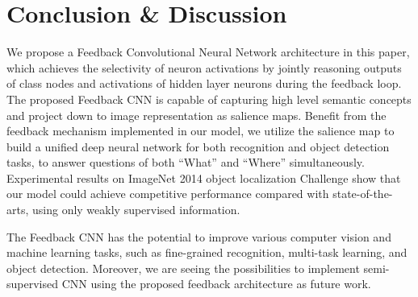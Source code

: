 \section{Conclusion \& Discussion}
\label{sec:conclusion}

We propose a Feedback Convolutional Neural Network architecture in this paper, which achieves the selectivity of neuron activations by jointly reasoning outputs of class nodes and activations of hidden layer neurons during the feedback loop. The proposed Feedback CNN is capable of capturing high level semantic concepts and project down to image representation as salience maps. Benefit from the feedback mechanism implemented in our model, we utilize the salience map to build a unified deep neural network for both recognition and object detection tasks, to answer questions of both ``What'' and ``Where'' simultaneously. Experimental results on ImageNet 2014 object localization Challenge show that our model could achieve competitive performance compared with state-of-the-arts, using only weakly supervised information.

The Feedback CNN has the potential to improve various computer vision and machine learning tasks, such as fine-grained recognition, multi-task learning, and object detection. Moreover, we are seeing the possibilities to implement semi-supervised CNN using the proposed feedback architecture as future work.


